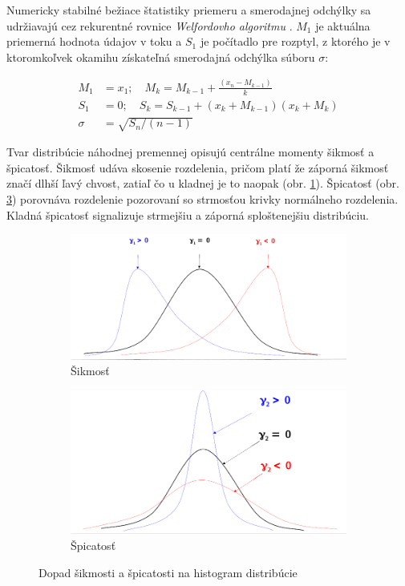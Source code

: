 Numericky stabilné bežiace štatistiky priemeru a smerodajnej odchýlky sa udržiavajú cez rekurentné rovnice
\emph{Welfordovho algoritmu} \cite{knuth}. $M_1$ je aktuálna priemerná hodnota údajov v toku a $S_1$ je počítadlo pre
rozptyl, z ktorého je v ktoromkoľvek okamihu získateľná smerodajná odchýlka súboru $\sigma$:
\begin{ceqn}\begin{align}
   M_1 &= x_1;\quad M_k = M_{k-1} + \frac{(x_n - M_{k-1})}{k} \\
   S_1 &= 0; \quad S_k = S_{k-1} + (x_k + M_{k-1})(x_k + M_k)  \\
   \sigma &= \sqrt{S_n / (n - 1)}
\end{align}\end{ceqn}

Tvar distribúcie náhodnej premennej opisujú centrálne momenty šikmosť a špicatosť. Šikmosť udáva skosenie
rozdelenia, pričom platí že záporná šikmosť značí dlhší ľavý chvost, zatiaľ čo u kladnej je to naopak (obr. \ref{fig:skewness}). 
Špicatosť  (obr. \ref{fig:kurtosis}) porovnáva rozdelenie pozorovaní so strmosťou krivky normálneho rozdelenia. Kladná špicatosť 
signalizuje strmejšiu a záporná sploštenejšiu distribúciu.
\begin{figure}[h]
\centering
\begin{subfigure}[b]{0.48\textwidth}
    \centering
    \includegraphics[width=\textwidth]{figures/analysis/skewness.png}
    \caption{Šikmosť}
    \label{fig:skewness}
\end{subfigure}
\hfill
\begin{subfigure}[b]{0.48\textwidth}
    \centering
    \includegraphics[width=\textwidth]{figures/analysis/kurtosis.png}
    \caption{Špicatosť}
    \label{fig:kurtosis}
\end{subfigure}
\caption{Dopad šikmosti a špicatosti na histogram distribúcie}
\end{figure}

